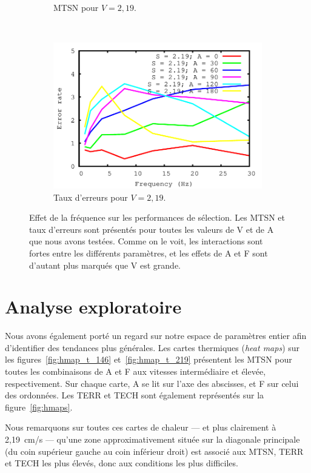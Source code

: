 \begin{figure}[!htb]
\begin{subfigure}[t]{\subImgWlineplot}
			\caption{MTSN pour $V = 2,19$.}
			\label{fig:fEffect_t_219}
		\end{subfigure}
		~
		\begin{subfigure}[t]{\subImgWlineplot}
			\centering
			\includegraphics[width=\textwidth]{figures/ch4/frequency_speed_2_19_errors}
			\caption{Taux d'erreurs pour $V = 2,19$.}
			\label{fig:fEffect_e_219}
		\end{subfigure}
		\caption[Effet de la fréquence sur les performances de sélection]{Effet de la fréquence sur les performances de sélection. Les MTSN et taux d'erreurs sont présentés pour toutes les valeurs de V et de A que nous avons testées. Comme on le voit, les interactions sont fortes entre les différents paramètres, et les effets de A et F sont d'autant plus marqués que V est grande.}
		\label{fig:fEffectPerf}
	\end{figure}

\section{Analyse exploratoire}
	Nous avons également porté un regard sur notre espace de paramètres entier afin d'identifier des tendances plus générales. Les cartes thermiques (\emph{heat maps}) sur les figures~\ref{fig:hmap_t_146} et~\ref{fig:hmap_t_219} présentent les MTSN pour toutes les combinaisons de A et F aux vitesses intermédiaire et élevée, respectivement. Sur chaque carte, A se lit sur l'axe des abscisses, et F sur celui des ordonnées. Les TERR et TECH sont également représentés sur la figure~\ref{fig:hmaps}.
	
	Nous remarquons sur toutes ces cartes de chaleur --- et plus clairement à 2,19~cm/s --- qu'une zone approximativement située sur la diagonale principale (du coin supérieur gauche au coin inférieur droit) est associé aux MTSN, TERR et TECH les plus élevés, donc aux conditions les plus difficiles.
	
